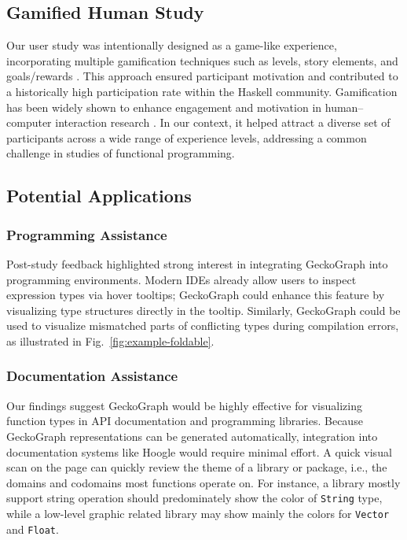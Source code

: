 \documentclass[preprint,12pt]{elsarticle}
\begin{document}
\subsection{Gamified Human Study}\label{sec:discussion:gamification}
Our user study was intentionally designed as a game-like experience, incorporating multiple gamification techniques such as levels, story elements, and goals/rewards \cite{Hamari2014-mc}. 
This approach ensured participant motivation and contributed to a historically high participation rate within the Haskell community. 
Gamification has been widely shown to enhance engagement and motivation in human–computer interaction research \cite{He2014-vp}. 
In our context, it helped attract a diverse set of participants across a wide range of experience levels, addressing a common challenge in studies of functional programming.

\subsection{Potential Applications}\label{sec:discussion:applications}

\subsubsection{Programming Assistance}
Post-study feedback highlighted strong interest in integrating GeckoGraph into programming environments. 
Modern IDEs already allow users to inspect expression types via hover tooltips; GeckoGraph could enhance this feature by visualizing type structures directly in the tooltip. 
Similarly, GeckoGraph could be used to visualize mismatched parts of conflicting types during compilation errors, as illustrated in Fig.~\ref{fig:example-foldable}.

\subsubsection{Documentation Assistance}
Our findings suggest GeckoGraph would be highly effective for visualizing function types in API documentation and programming libraries. 
Because GeckoGraph representations can be generated automatically, integration into documentation systems like Hoogle \cite{Mitchell_undated-fb} would require minimal effort. 
A quick visual scan on the page can quickly review the theme of a library or package, i.e., the domains and codomains most functions operate on. For instance, a library mostly support string operation should predominately show the color of {\tt String} type, while a low-level graphic related library may show mainly the colors for {\tt Vector} and {\tt Float}.
\end{document}
